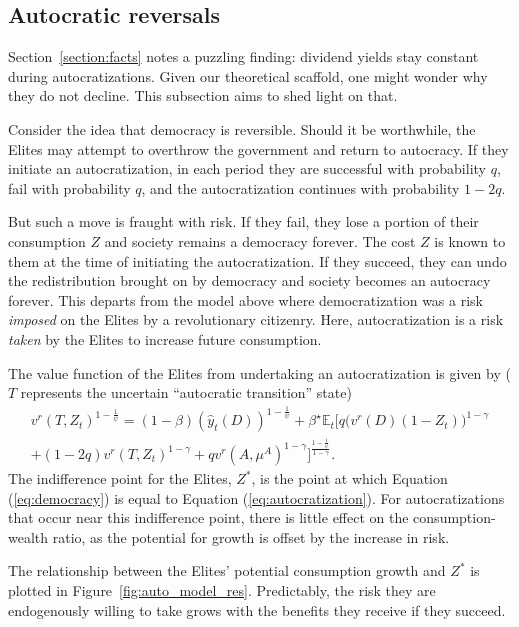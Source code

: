 \subsection{Autocratic reversals}\label{section:auto_reverse}

Section~\ref{section:facts} notes a puzzling finding: dividend yields stay constant during autocratizations.  Given our theoretical scaffold, one might wonder why they do not decline. This subsection aims to shed light on that.

Consider the idea that democracy is reversible. Should it be worthwhile, the Elites may attempt to overthrow the government and return to autocracy.  If they initiate an autocratization, in each period they are successful with probability $q$, fail with probability $q$, and the autocratization continues with probability $1-2q$.

But such a move is fraught with risk. If they fail, they lose a portion of their consumption $Z$ and society remains a democracy forever. The cost $Z$ is known to them at the time of initiating the autocratization. If they succeed, they can undo the redistribution brought on by democracy and society becomes an autocracy forever.  This departs from the model above where democratization was a risk \textit{imposed} on the Elites by a revolutionary citizenry. Here, autocratization is a risk \textit{taken} by the Elites to increase future consumption.

The value function of the Elites from undertaking an autocratization is given by ($T$ represents the uncertain ``autocratic transition'' state)
\begin{multline}
v^r(T,Z_t)^{1-\frac{1}{\psi}} = (1-\beta)(\hat{y}_t(D))^{1-\frac{1}{\psi}} + \beta^\star \mathbb{E}_t\bigg[q \Big(v^r(D)(1-Z_t)\Big)^{1-\gamma} \\ + (1-2q)v^r(T,Z_t)^{1-\gamma} + q v^{r}(A,\mu^A)^{1-\gamma}\bigg]^{\frac{1-\frac{1}{\psi}}{1-\gamma}}.\label{eq:autocratization}
\end{multline}
The indifference point for the Elites, $Z^*$, is the point at which Equation (\ref{eq:democracy}) is equal to Equation (\ref{eq:autocratization}). For autocratizations that occur near this indifference point, there is little effect on the consumption-wealth ratio, as the potential for growth is offset by the increase in risk.  

The relationship between the Elites' potential consumption growth and $Z^*$ is plotted in Figure~\ref{fig:auto_model_res}. Predictably, the risk they are endogenously willing to take grows with the benefits they receive if they succeed.

